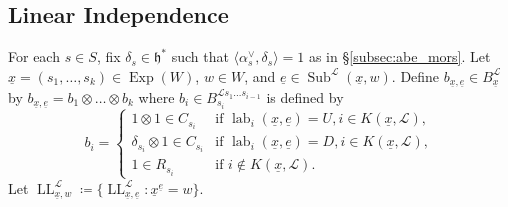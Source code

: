 \documentclass{amsart}
\newcommand{\scrL}{\mathcal{L}}
\newcommand{\fr}[1]{\mathfrak{#1}}
\DeclareMathOperator{\LL}{LL}
\DeclareMathOperator{\lab}{lab}
\DeclareMathOperator{\Exp}{Exp}
\DeclareMathOperator{\Subexp}{Sub}
\newcommand{\ue}{\underline{e}}
\newcommand{\ux}{\underline{x}}
\theoremstyle{definition}
\numberwithin{equation}{subsection}
\begin{document}
\subsection{Linear Independence}

For each $s \in S$, fix $\delta_s \in \fr{h}^*$ such that $\langle \alpha_s^{\vee}, \delta_s \rangle = 1$ as in \S\ref{subsec:abe_mors}.
Let $\ux = (s_1, \ldots, s_k) \in \Exp (W)$, $w\in W$, and $\ue \in \Subexp^{\scrL} (\ux, w)$.
Define $b_{\ux, \ue} \in B_{\ux}^{\scrL}$ by $b_{\ux, \ue} = b_1 \otimes \ldots \otimes b_k$ where $b_i \in B_{s_i}^{\scrL s_{1} \ldots s_{i-1}}$ is defined by
\[b_i = \begin{cases} 1 \otimes 1 \in C_{s_i} & \text{if } \lab_i (\ux, \ue) = U, i \in K(\ux, \scrL), \\ \delta_{s_i} \otimes 1 \in C_{s_i} & \text{if } \lab_i (\ux, \ue) = D, i \in K(\ux, \scrL), \\ 1 \in R_{s_i} & \text{if } i \notin K(\ux, \scrL).\end{cases}\]
Let $\LL_{\ux, w}^{\scrL} \coloneq \{ \LL_{\ux, \ue}^{\scrL} \colon \ux^{\ue} = w \}$.
\end{document}
